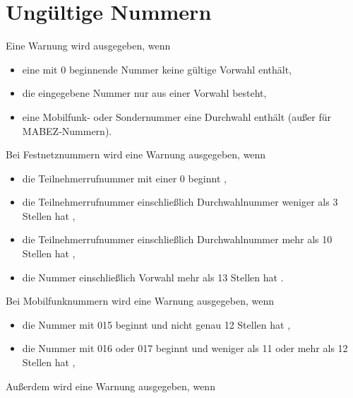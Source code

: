 \documentclass[numbers=noenddot]{scrreprt}
\newcommand{\UeberschriftUngueltig}{\section{Ungültige Nummern}}
\newcommand{\WarnungWenn}{Eine Warnung wird ausgegeben, wenn}
\begin{document}
\UeberschriftUngueltig
\WarnungWenn
\begin{itemize}
\item eine mit 0 beginnende Nummer keine gültige Vorwahl enthält,
\item die eingegebene Nummer nur aus einer Vorwahl besteht,
\item eine Mobilfunk- oder Sondernummer eine Durchwahl enthält (außer für MABEZ-Nummern).
\end{itemize}
Bei Festnetznummern wird eine Warnung ausgegeben, wenn
\begin{itemize}
\item die Teilnehmerrufnummer mit einer 0 beginnt \cite[6]{BNA-nummernplan},
\item die Teilnehmerrufnummer einschließlich Durchwahlnummer weniger als 3 Stellen hat \cite[6]{BNA-nummernplan},
\item die Teilnehmerrufnummer einschließlich Durchwahlnummer mehr als 10 Stellen hat \cite[2]{BNA-Struktur},
\item die Nummer einschließlich Vorwahl mehr als 13 Stellen hat \cite[2]{BNA-Struktur}.
\end{itemize}
Bei Mobilfunknummern wird eine Warnung ausgegeben, wenn
\begin{itemize}
\item die Nummer mit 015 beginnt und nicht genau 12 Stellen hat \cite[49\psq]{BNA-konzept},
\item die Nummer mit 016 oder 017 beginnt und weniger als 11 oder mehr als 12 Stellen hat \cite[50]{BNA-konzept},
\end{itemize}
Außerdem wird eine Warnung ausgegeben, wenn
\end{document}
